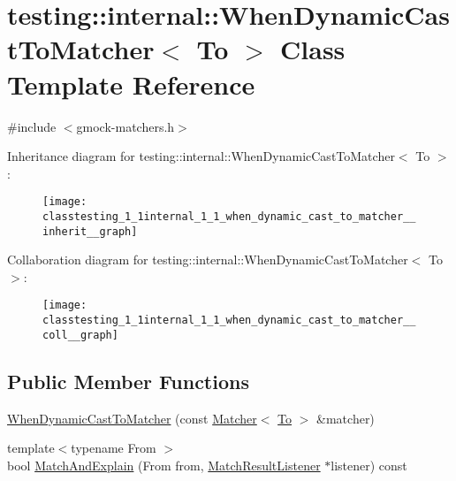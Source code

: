 \hypertarget{classtesting_1_1internal_1_1_when_dynamic_cast_to_matcher}{}\section{testing\+:\+:internal\+:\+:When\+Dynamic\+Cast\+To\+Matcher$<$ To $>$ Class Template Reference}
\label{classtesting_1_1internal_1_1_when_dynamic_cast_to_matcher}


{\ttfamily \#include $<$gmock-\/matchers.\+h$>$}



Inheritance diagram for testing\+:\+:internal\+:\+:When\+Dynamic\+Cast\+To\+Matcher$<$ To $>$\+:
\nopagebreak
\begin{figure}[H]
\begin{center}
\leavevmode
\texttt{[image: classtesting\_1\_1internal\_1\_1\_when\_dynamic\_cast\_to\_matcher\_\_inherit\_\_graph]}
\end{center}
\end{figure}


Collaboration diagram for testing\+:\+:internal\+:\+:When\+Dynamic\+Cast\+To\+Matcher$<$ To $>$\+:
\nopagebreak
\begin{figure}[H]
\begin{center}
\leavevmode
\texttt{[image: classtesting\_1\_1internal\_1\_1\_when\_dynamic\_cast\_to\_matcher\_\_coll\_\_graph]}
\end{center}
\end{figure}
\subsection*{Public Member Functions}
\begin{DoxyCompactItemize}
\item 
\hyperlink{classtesting_1_1internal_1_1_when_dynamic_cast_to_matcher_a44e444d218197f8180c5ac7fca135f9a}{When\+Dynamic\+Cast\+To\+Matcher} (const \hyperlink{classtesting_1_1_matcher}{Matcher}$<$ \hyperlink{classtesting_1_1internal_1_1_to}{To} $>$ \&matcher)
\item 
{\footnotesize template$<$typename From $>$ }\\bool \hyperlink{classtesting_1_1internal_1_1_when_dynamic_cast_to_matcher_afea5e5230fa9955bfdf9902587c44676}{Match\+And\+Explain} (From from, \hyperlink{classtesting_1_1_match_result_listener}{Match\+Result\+Listener} $\ast$listener) const 
\end{DoxyCompactItemize}
